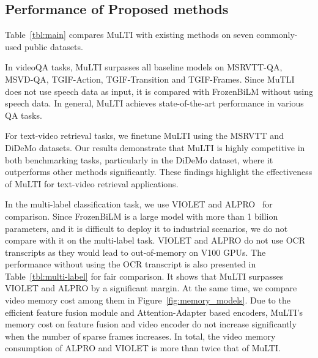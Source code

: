 \documentclass[10pt,twocolumn,letterpaper]{article}
\begin{document}
\subsection{Performance of Proposed methods}\label{sec:exp-proposes-method}
\vspace{-0.5ex}
Table~\ref{tbl:main} compares MuLTI with existing methods on seven commonly-used public datasets. 

In videoQA tasks, MuLTI surpasses all baseline models on MSRVTT-QA, MSVD-QA, TGIF-Action, TGIF-Transition and TGIF-Frames. 
Since MuTLI does not use speech data as input, it is compared with FrozenBiLM\cite{Yang2022ZeroShotVQ} without using speech data. In general, MuLTI achieves state-of-the-art performance in various QA tasks. 

For text-video retrieval tasks, we finetune MuLTI using the MSRVTT and DiDeMo datasets. Our results demonstrate that MuLTI is highly competitive in both benchmarking tasks, particularly in the DiDeMo dataset, where it outperforms other methods significantly. These findings highlight the effectiveness of MuLTI for text-video retrieval applications.

In the multi-label classification task, we use VIOLET\cite{Fu2021VIOLETE} and ALPRO~\cite{Li2021AlignAP} for comparison. 
Since FrozenBiLM\cite{Yang2022ZeroShotVQ} is a large model with more than 1 billion parameters, and it is difficult to deploy it to industrial scenarios, we do not compare with it on the multi-label task. 
VIOLET and ALPRO do not use OCR transcripts as they would lead to out-of-memory on V100 GPUs. The performance without using the OCR transcript is also presented in Table~\ref{tbl:multi-label} for fair comparison. It shows that MuLTI surpasses VIOLET and ALPRO by a significant margin.
At the same time, we compare video memory cost among them in Figure~\ref{fig:memory_models}. Due to the efficient feature fusion module and Attention-Adapter based encoders, MuLTI's memory cost on feature fusion and video encoder do not increase significantly when the number of sparse frames increases. In total, the video memory consumption of ALPRO and VIOLET is more than twice that of MuLTI. 
\end{document}

